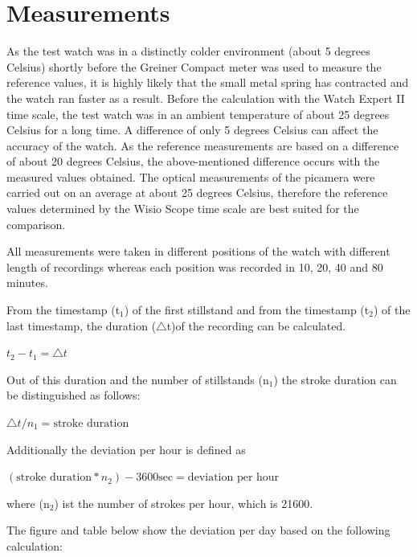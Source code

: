 \documentclass[12pt, a4paper]{report}
\begin{document}
    \section{Measurements}
As the test watch was in a distinctly colder environment (about 5 degrees Celsius) shortly before the Greiner Compact meter was used to measure the reference values, it is highly likely that the small metal spring has contracted and the watch ran faster as a result. Before the calculation with the Watch Expert II time scale, the test watch was in an ambient temperature of about 25 degrees Celsius for a long time. A difference of only 5 degrees Celsius can affect the accuracy of the watch. \cite{Witschi_basics} As the reference measurements are based on a difference of about 20 degrees Celsius, the above-mentioned difference occurs with the measured values obtained.
The optical measurements of the picamera were carried out on an average at about 25 degrees Celsius, therefore the reference values determined by the Wisio Scope time scale are best suited for the comparison.

    All measurements were taken in different positions of the watch with different length
    of recordings whereas each position was recorded in 10, 20, 40 and 80 minutes.
\newline

From the timestamp (t$_1$) of the first stillstand and from the timestamp (t$_2$) of the last timestamp, the duration ($\triangle$t)of the recording can be calculated.
    \bigskip
    \begin{center}
    \(t_2-t_1 = \triangle t\)
    \end{center}
     \bigskip
    
Out of this duration and the number of stillstands (n$_1$) the stroke duration can be distinguished as follows:
    \bigskip
        \begin{center}
	\( \triangle t / n_1 = \text{stroke duration}\)
	    \end{center}
	\bigskip

Additionally the deviation per hour is defined as 
  \bigskip
        \begin{center}
    \((\text{stroke duration}*n_2)-3600 \text{sec}=\text{deviation per hour}\)
        
    \end{center}
        \bigskip
where (n$_2$) ist the number of strokes per hour, which is 21600.

    The figure and table below show the deviation per day based on the following calculation:
\end{document}
